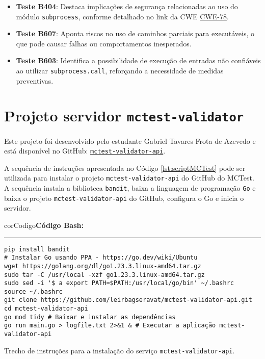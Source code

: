 \begin{itemize}
    \item \textbf{Teste B404}: Destaca implicações de segurança relacionadas ao uso do módulo \texttt{subprocess}, conforme detalhado no link da CWE \href{https://cwe.mitre.org/data/definitions/78.html}{CWE-78}.
    \item \textbf{Teste B607}: Aponta riscos no uso de caminhos parciais para executáveis, o que pode causar falhas ou comportamentos inesperados.
    \item \textbf{Teste B603}: Identifica a possibilidade de execução de entradas não confiáveis ao utilizar \texttt{subprocess.call}, reforçando a necessidade de medidas preventivas.
\end{itemize}


\section{Projeto servidor \texttt{mctest-validator}}\label{sec:projeto-servidor-mctest-validator}

Este projeto foi desenvolvido pelo estudante Gabriel Tavares Frota de Azevedo e está disponível no GitHub: \href{https://github.com/leirbagseravat/mctest-validator-api}{\texttt{mctest-validator-api}}.


A sequência de instruções apresentada no Código \ref{lst:scriptMCTest} pode ser utilizada para instalar o projeto \texttt{mctest-validator-api} do GitHub do MCTest. A sequência instala a biblioteca \texttt{bandit}, baixa a linguagem de programação \texttt{Go} e baixa o projeto \texttt{mctest-validator-api} do GitHub, configura o Go e inicia o servidor.

\begin{listing}[!ht]
\begin{myboxCode}{corCodigo}{\textbf{Código Bash: }}\vspace{3mm}
\hrule
\begin{verbatim}
pip install bandit
# Instalar Go usando PPA - https://go.dev/wiki/Ubuntu
wget https://golang.org/dl/go1.23.3.linux-amd64.tar.gz
sudo tar -C /usr/local -xzf go1.23.3.linux-amd64.tar.gz
sudo sed -i '$ a export PATH=$PATH:/usr/local/go/bin' ~/.bashrc
source ~/.bashrc
git clone https://github.com/leirbagseravat/mctest-validator-api.git
cd mctest-validator-api
go mod tidy # Baixar e instalar as dependências
go run main.go > logfile.txt 2>&1 & # Executar a aplicação mctest-validator-api
\end{verbatim}
\end{myboxCode}
\caption{Trecho de instruções para a instalação do serviço \texttt{mctest-validator-api}.}
\label{lst:scriptMCTest}
\end{listing}

